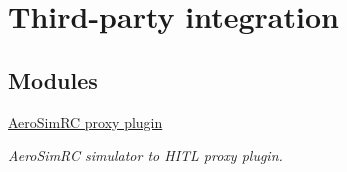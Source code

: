 \hypertarget{group__rd_party}{\section{\-Third-\/party integration}
\label{group__rd_party}
}
\subsection*{\-Modules}
\begin{DoxyCompactItemize}
\item 
\hyperlink{group___aero_sim_r_c}{\-Aero\-Sim\-R\-C proxy plugin}
\begin{DoxyCompactList}\small\item\em \-Aero\-Sim\-R\-C simulator to \-H\-I\-T\-L proxy plugin. \end{DoxyCompactList}\end{DoxyCompactItemize}
